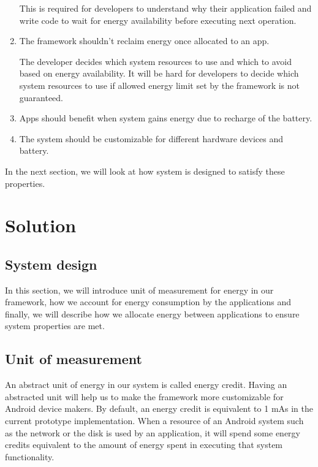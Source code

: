 \begin{enumerate}
This is required for developers to understand why their application failed and write code to wait for energy availability before executing next operation.

\item The framework shouldn't reclaim energy once allocated to an app.  

The developer decides which system resources to use and which to avoid based on energy availability.  It will be hard for developers to decide which system resources to use if allowed energy limit set by the framework is not guaranteed.

\item Apps should benefit when system gains energy due to recharge of the battery.
\item The system should be customizable for different hardware devices and battery.

\end{enumerate}


In the next section, we will look at how system is designed to satisfy these properties.


\section{Solution}



\subsection{System design}


In this section, we will introduce unit of measurement for energy in our framework, how we account for energy consumption by the applications and finally, we will describe how we allocate energy between applications to ensure system properties are met.

\subsection{Unit of measurement}

An abstract unit of energy in our system is called energy credit. Having an abstracted unit will help us to make the framework more customizable for Android device makers. By default, an energy credit is equivalent to 1 mAs in the current prototype implementation. When a resource of an Android system such as the network or the disk is used by an application, it will spend some energy credits equivalent to the amount of energy spent in executing that system functionality.

